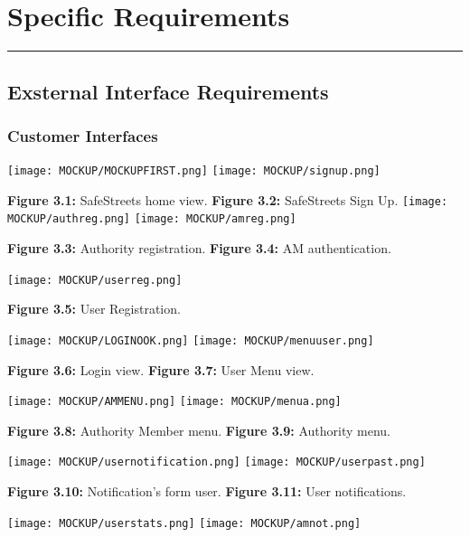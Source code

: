 \documentclass[12pt]{article}
\begin{document}

\newpage
\section{Specific Requirements}
\hrule
\vspace{8mm}
\subsection{Exsternal Interface Requirements}
\vspace{2mm}
\subsubsection{Customer Interfaces}
\vspace{3mm}
		 
		 \texttt{[image: MOCKUP/MOCKUPFIRST.png]}                  \hfill \texttt{[image: MOCKUP/signup.png]}
		 
		 \textbf{Figure 3.1:} SafeStreets home view.  \hfill \textbf{Figure 3.2:} SafeStreets Sign Up.
\newpage
 \texttt{[image: MOCKUP/authreg.png]}                  \hfill \texttt{[image: MOCKUP/amreg.png]}
		 
		 \textbf{Figure 3.3:} Authority registration.   \hfill \textbf{Figure 3.4:} AM authentication.
		\begin{center}
  \texttt{[image: MOCKUP/userreg.png]}                  
  
		 \textbf{Figure 3.5:} User Registration.
	\end{center}


\newpage
 	 \texttt{[image: MOCKUP/LOGINOOK.png]}                  \hfill \texttt{[image: MOCKUP/menuuser.png]}
		 
		 \textbf{Figure 3.6:} Login view.  \hfill \textbf{Figure 3.7:} User Menu view.
		
  \texttt{[image: MOCKUP/AMMENU.png]}                  \hfill \texttt{[image: MOCKUP/menua.png]}
		 
		 \textbf{Figure 3.8:} Authority Member menu.  \hfill \textbf{Figure 3.9:} Authority menu.
		 

\newpage
 	 \texttt{[image: MOCKUP/usernotification.png]}                  \hfill \texttt{[image: MOCKUP/userpast.png]}
		 
		 \textbf{Figure 3.10:} Notification's form user.  \hfill \textbf{Figure 3.11:} User notifications.
		
  \texttt{[image: MOCKUP/userstats.png]}                  \hfill \texttt{[image: MOCKUP/amnot.png]}
		 
\end{document}
